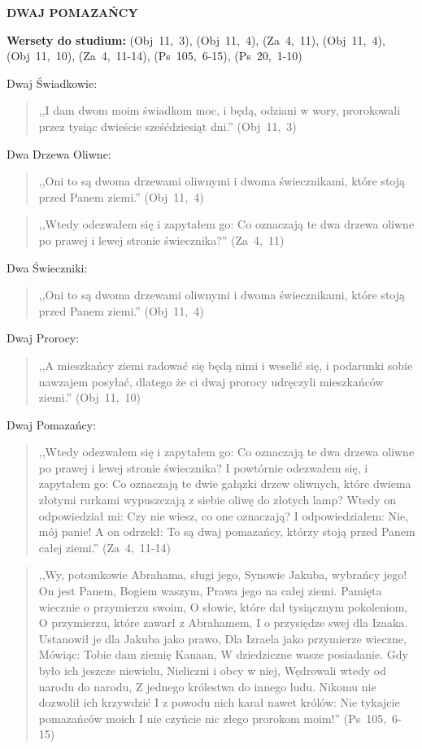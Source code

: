 \documentclass[10pt,a4paper,oneside]{article}
\begin{document}
\centerline{\textbf{\MakeUppercase{Dwaj Pomazańcy}}}
\begin{center}
\textbf{Wersety do studium:} \mbox{(Obj 11, 3)}, \mbox{(Obj 11, 4)}, \mbox{(Za 4, 11)}, \mbox{(Obj 11, 4)}, \mbox{(Obj 11, 10)}, \mbox{(Za 4, 11-14)}, \mbox{(Ps 105, 6-15)}, \mbox{(Ps 20, 1-10)}
\end{center}
Dwaj Świadkowie:
\begin{quote}
,,I dam dwom moim świadkom moc, i będą, odziani w wory, prorokowali przez tysiąc dwieście sześćdziesiąt dni.'' \mbox{(Obj 11, 3)}
\end{quote}
Dwa Drzewa Oliwne:
\begin{quote}
,,Oni to są dwoma drzewami oliwnymi i dwoma świecznikami, które stoją przed Panem ziemi.'' \mbox{(Obj 11, 4)}
\end{quote}
\begin{quote}
,,Wtedy odezwałem się i zapytałem go: Co oznaczają te dwa drzewa oliwne po prawej i lewej stronie świecznika?'' \mbox{(Za 4, 11)}
\end{quote}
Dwa Świeczniki:
\begin{quote}
,,Oni to są dwoma drzewami oliwnymi i dwoma świecznikami, które stoją przed Panem ziemi.'' \mbox{(Obj 11, 4)}
\end{quote}
Dwaj Prorocy:
\begin{quote}
,,A mieszkańcy ziemi radować się będą nimi i weselić się, i podarunki sobie nawzajem posyłać, dlatego że ci dwaj prorocy udręczyli mieszkańców ziemi.'' \mbox{(Obj 11, 10)}
\end{quote}
Dwaj Pomazańcy:
\begin{quote}
,,Wtedy odezwałem się i zapytałem go: Co oznaczają te dwa drzewa oliwne po prawej i lewej stronie świecznika? I powtórnie odezwałem się, i zapytałem go: Co oznaczają te dwie gałązki drzew oliwnych, które dwiema złotymi rurkami wypuszczają z siebie oliwę do złotych lamp? Wtedy on odpowiedział mi: Czy nie wiesz, co one oznaczają? I odpowiedziałem: Nie, mój panie! A on odrzekł: To są dwaj pomazańcy, którzy stoją przed Panem całej ziemi.'' \mbox{(Za 4, 11-14)}
\end{quote}
\begin{quote}
,,Wy, potomkowie Abrahama, sługi jego, Synowie Jakuba, wybrańcy jego! On jest Panem, Bogiem waszym, Prawa jego na całej ziemi. Pamięta wiecznie o przymierzu swoim, O słowie, które dał tysiącznym pokoleniom, O przymierzu, które zawarł z Abrahamem, I o przysiędze swej dla Izaaka. Ustanowił je dla Jakuba jako prawo, Dla Izraela jako przymierze wieczne, Mówiąc: Tobie dam ziemię Kanaan, W dziedziczne wasze posiadanie. Gdy było ich jeszcze niewielu, Nieliczni i obcy w niej, Wędrowali wtedy od narodu do narodu, Z jednego królestwa do innego ludu. Nikomu nie dozwolił ich krzywdzić I z powodu nich karał nawet królów: Nie tykajcie pomazańców moich I nie czyńcie nic złego prorokom moim!'' \mbox{(Ps 105, 6-15)}
\end{quote}
\end{document}
